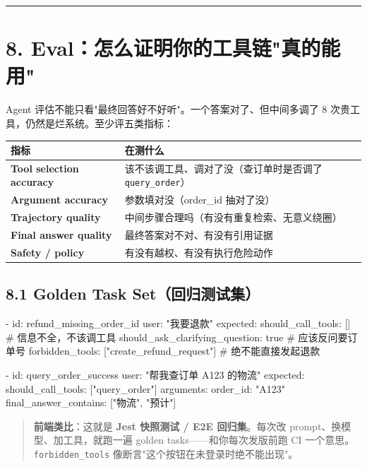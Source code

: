 \bigskip\hrule\bigskip

\section{8. Eval：怎么证明你的工具链"真的能用"}

Agent 评估不能只看"最终回答好不好听"。一个答案对了、但中间多调了 8 次贵工具，仍然是烂系统。至少评五类指标：

\begingroup
\scriptsize
\setlength{\tabcolsep}{3pt}
\begin{longtable}{|p{}|p{}|}
\hline
指标 & 在测什么 \\ \hline
\textbf{Tool selection accuracy} & 该不该调工具、调对了没（查订单时是否调了 \texttt{query\_order}） \\ \hline
\textbf{Argument accuracy} & 参数填对没（order\_id 抽对了没） \\ \hline
\textbf{Trajectory quality} & 中间步骤合理吗（有没有重复检索、无意义绕圈） \\ \hline
\textbf{Final answer quality} & 最终答案对不对、有没有引用证据 \\ \hline
\textbf{Safety / policy} & 有没有越权、有没有执行危险动作 \\ \hline
\end{longtable}
\endgroup

\subsection{8.1 Golden Task Set（回归测试集）}

\begin{codeblock}
- id: refund_missing_order_id
  user: "我要退款"
  expected:
    should_call_tools: []                       # 信息不全，不该调工具
    should_ask_clarifying_question: true        # 应该反问要订单号
    forbidden_tools: ["create_refund_request"]  # 绝不能直接发起退款

- id: query_order_success
  user: "帮我查订单 A123 的物流"
  expected:
    should_call_tools: ["query_order"]
    arguments: { order_id: "A123" }
    final_answer_contains: ["物流", "预计"]
\end{codeblock}

\begin{quote}
 \textbf{前端类比}：这就是 \textbf{Jest 快照测试 / E2E 回归集}。每次改 prompt、换模型、加工具，就跑一遍 golden tasks——和你每次发版前跑 CI 一个意思。\texttt{forbidden\_tools} 像断言"这个按钮在未登录时绝不能出现"。
\end{quote}

